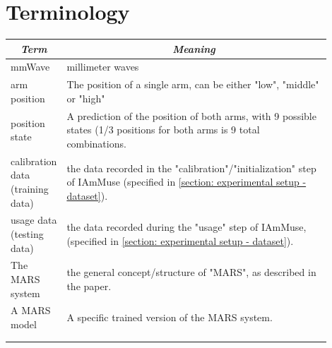\chapter*{Terminology}

\begin{table}[htpb]
    \centering
    \begin{tabular}{l|p{0.9\linewidth}}
        \multicolumn{1}{c|}{\textit{\textbf{Term}}} & \multicolumn{1}{c}{\textit{\textbf{Meaning}}}                                                   
        \tabularnewline \hline 
         mmWave & millimeter waves 
         \tabularnewline \hline
         arm position & The position of a single arm, can be either "low", "middle" or "high" 
         \tabularnewline \hline
         position state & A prediction of the position of both arms, with 9 possible states (1/3 positions for both arms is 9 total combinations. 
         \tabularnewline \hline
         calibration data (training data) & the data recorded in the "calibration"/"initialization" step of IAmMuse (specified in \cref{section: experimental setup - dataset}).
         \tabularnewline \hline
         usage data (testing data) & the data recorded during the "usage" step of IAmMuse, (specified in \cref{section: experimental setup - dataset}).
         \tabularnewline \hline
         The MARS system & the general concept/structure of "MARS", as described in the paper.
         \tabularnewline \hline
         A MARS model & A specific trained version of the MARS system.
         \tabularnewline \hline
         &
         \tabularnewline \hline
         &
         \tabularnewline
    \end{tabular}
\end{table}

